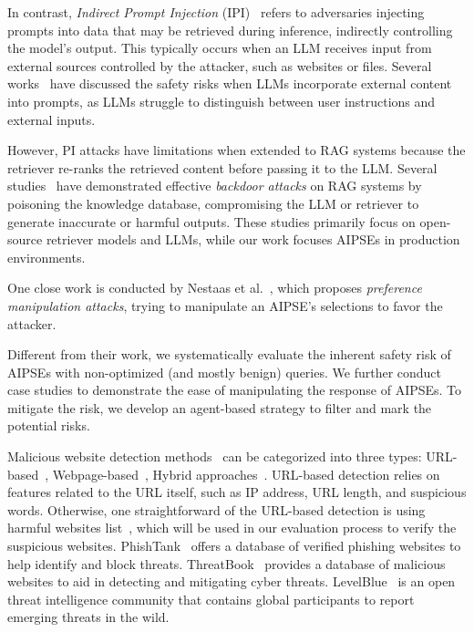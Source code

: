 In contrast, \textit{Indirect Prompt Injection} (IPI)~\cite{Greshake_inderect} refers to adversaries injecting prompts into data that may be retrieved during inference, indirectly controlling the model's output.
This typically occurs when an LLM receives input from external sources controlled by the attacker, such as websites or files.
Several works~\cite{Universal_Prompt_Injection,Greshake_inderect,benchmark_indirect} have discussed the safety risks when LLMs incorporate external content into prompts, as LLMs struggle to distinguish between user instructions and external inputs.

However, PI attacks have limitations when extended to RAG systems because the retriever re-ranks the retrieved content before passing it to the LLM.
Several studies~\cite{zou2024poisonedrag, cheng2024trojanragretrievalaugmentedgenerationbackdoor,ragattack} have demonstrated effective \textit{backdoor attacks} on RAG systems by poisoning the knowledge database, compromising the LLM or retriever to generate inaccurate or harmful outputs.
These studies primarily focus on open-source retriever models and LLMs, while our work focuses AIPSEs in production environments.

One close work is conducted by Nestaas et al.~\cite{nestaas2024adversarialsearchengineoptimization}, which proposes \textit{preference manipulation attacks}, trying to manipulate an AIPSE's selections to favor the attacker.

Different from their work, we systematically evaluate the inherent safety risk of AIPSEs with non-optimized (and mostly benign) queries.
We further conduct case studies to demonstrate the ease of manipulating the response of AIPSEs.
To mitigate the risk, we develop an agent-based strategy to filter and mark the potential risks.

Malicious website detection methods~\cite{phishing_dection_survey,phishing_dection_survey2} can be categorized into three types: URL-based~\cite{url1,url2,url3,url4}, Webpage-based~\cite{web1,web2,web3,web4}, Hybrid approaches~\cite{hybrid1,hybrid2}.
URL-based detection relies on features related to the URL itself, such as IP address, URL length, and suspicious words.
Otherwise, one straightforward of the URL-based detection is using harmful websites list~\cite{checkphish,phishtank,scamadviser,SURBL,metamask}, which will be used in our evaluation process to verify the suspicious websites.
PhishTank~\cite{phishtank} offers a database of verified phishing websites to help identify and block threats.
ThreatBook~\cite{ThreatBook} provides a database of malicious websites to aid in detecting and mitigating cyber threats.
LevelBlue~\cite{LevelBlue} is an open threat intelligence community that contains global participants to report emerging threats in the wild.

